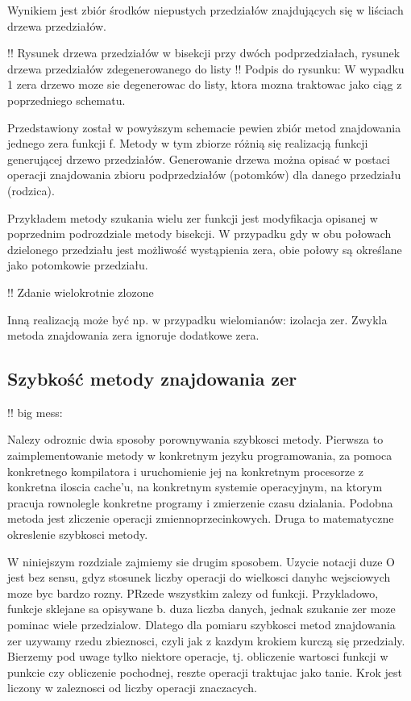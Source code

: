 \documentclass[11pt,a4paper,oneside]{report}
\begin{document}
Wynikiem jest zbiór środków niepustych przedziałów znajdujących się w liściach drzewa przedziałów.

!! Rysunek drzewa przedziałów w bisekcji przy dwóch podprzedziałach, rysunek drzewa przedziałów zdegenerowanego do listy
!! Podpis do rysunku: W wypadku 1 zera drzewo moze sie degenerowac do listy, ktora mozna traktowac jako ciąg z poprzedniego schematu.

Przedstawiony został w powyższym schemacie pewien zbiór metod znajdowania jednego zera funkcji f. Metody w tym zbiorze różnią się realizacją funkcji generującej drzewo przedziałów. Generowanie drzewa można opisać w postaci operacji znajdowania zbioru podprzedziałów (potomków) dla danego przedziału (rodzica).

Przykładem metody szukania wielu zer funkcji jest modyfikacja opisanej w poprzednim podrozdziale metody bisekcji. W przypadku gdy w obu połowach dzielonego przedziału jest możliwość wystąpienia zera, obie połowy są określane jako potomkowie przedziału.

!! Zdanie wielokrotnie zlozone

Inną realizacją może być np. w przypadku wielomianów: izolacja zer. Zwykla metoda znajdowania zera ignoruje dodatkowe zera.

\subsection{Szybkość metody znajdowania zer}

!! big mess:

Nalezy odroznic dwia sposoby porownywania szybkosci metody. Pierwsza to zaimplementowanie metody w konkretnym jezyku programowania, za pomoca konkretnego kompilatora i uruchomienie jej na konkretnym procesorze z konkretna iloscia cache'u, na konkretnym systemie operacyjnym, na ktorym pracuja rownolegle konkretne programy i zmierzenie czasu dzialania. Podobna metoda jest zliczenie operacji zmiennoprzecinkowych. Druga to matematyczne okreslenie szybkosci metody. 

W niniejszym rozdziale zajmiemy sie drugim sposobem. Uzycie notacji duze O jest bez sensu, gdyz stosunek liczby operacji do wielkosci danyhc wejsciowych moze byc bardzo rozny. PRzede wszystkim zalezy od funkcji. Przykladowo, funkcje sklejane sa opisywane b. duza liczba danych, jednak szukanie zer moze pominac wiele przedzialow. Dlatego dla pomiaru szybkosci metod znajdowania zer uzywamy rzedu zbieznosci, czyli jak z kazdym krokiem kurczą się przedzialy. Bierzemy pod uwage tylko niektore operacje, tj. obliczenie wartosci funkcji w punkcie czy obliczenie pochodnej, reszte operacji traktujac jako tanie. Krok jest liczony w zaleznosci od liczby operacji znaczacych.
\end{document}
